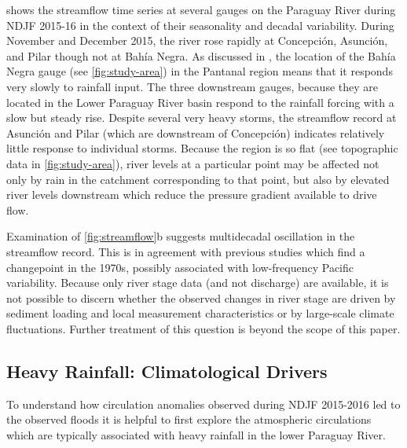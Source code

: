 \documentclass[twocol]{ametsoc}
\begin{document}
 shows the streamflow time series at several gauges on the Paraguay River during NDJF 2015-16 in the context of their seasonality and decadal variability.
During November and December 2015, the river rose rapidly at Concepci\'on, Asunci\'on, and Pilar though not at Bah\'ia Negra.
As discussed in \citet{Bravo:2011et,Barros:2004bn}, the location of the Bah\'ia Negra gauge (see \cref{fig:study-area}) in the Pantanal region means that it responds very slowly to rainfall input.
The three downstream gauges, because they are located in the Lower Paraguay River basin respond to the rainfall forcing with a slow but steady rise.
Despite several very heavy storms, the streamflow record at Asunci\'on and Pilar (which are downstream of Concepci\'on) indicates relatively little response to individual storms.
Because the region is so flat (see topographic data in \cref{fig:study-area}), river levels at a particular point may be affected not only by rain in the catchment corresponding to that point, but also by elevated river levels downstream which reduce the pressure gradient available to drive flow.

Examination of \cref{fig:streamflow}b suggests multidecadal oscillation in the streamflow record.
This is in agreement with previous studies \citep{Collischonn:2001bi,Carvalho2011} which find a changepoint in the 1970s, possibly associated with low-frequency Pacific variability.
Because only river stage data (and not discharge) are available, it is not possible to discern whether the observed changes in river stage are driven by sediment loading and local measurement characteristics or by large-scale climate fluctuations.
Further treatment of this question is beyond the scope of this paper.

\subsection{Heavy Rainfall: Climatological Drivers} \label{sec:rainfall-circulation}

To understand how circulation anomalies observed during NDJF 2015-2016 led to the observed floods it is helpful to first explore the atmospheric circulations which are typically associated with heavy rainfall in the lower Paraguay River.
\end{document}
